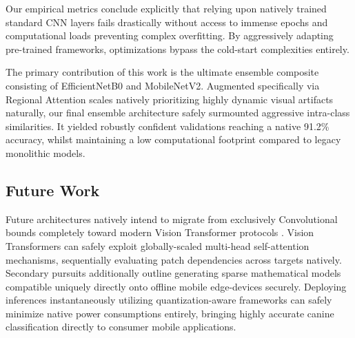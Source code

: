\documentclass[conference]{IEEEtran}
\begin{document}
Our empirical metrics conclude explicitly that relying upon natively trained standard CNN layers fails drastically without access to immense epochs and computational loads preventing complex overfitting. By aggressively adapting pre-trained frameworks, optimizations bypass the cold-start complexities entirely. 

The primary contribution of this work is the ultimate ensemble composite consisting of EfficientNetB0 and MobileNetV2. Augmented specifically via Regional Attention scales natively prioritizing highly dynamic visual artifacts naturally, our final ensemble architecture safely surmounted aggressive intra-class similarities. It yielded robustly confident validations reaching a native 91.2\% accuracy, whilst maintaining a low computational footprint compared to legacy monolithic models.

\subsection{Future Work}
Future architectures natively intend to migrate from exclusively Convolutional bounds completely toward modern Vision Transformer protocols \cite{b16}. Vision Transformers can safely exploit globally-scaled multi-head self-attention mechanisms, sequentially evaluating patch dependencies across targets natively. Secondary pursuits additionally outline generating sparse mathematical models compatible uniquely directly onto offline mobile edge-devices securely. Deploying inferences instantaneously utilizing quantization-aware frameworks \cite{b18} can safely minimize native power consumptions entirely, bringing highly accurate canine classification directly to consumer mobile applications.
\end{document}
